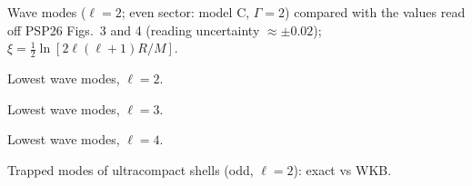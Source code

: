 \documentclass[11pt,a4paper]{article}
\numberwithin{equation}{section}
\begin{document}
\begin{table}[h]\centering\small
\caption{Wave modes ($\ell=2$; even sector: model C, $\Gamma=2$) compared with the values read off PSP26 Figs.~3 and 4 (reading uncertainty $\approx\pm0.02$); $\xi=\tfrac12\ln[2\ell(\ell+1)R/M]$.}\label{tab:psp}

\end{table}

\begin{table}[h]\centering\scriptsize
\caption{Lowest wave modes, $\ell=2$.}\label{tab:qnm2}

\end{table}
\begin{table}[h]\centering\scriptsize
\caption{Lowest wave modes, $\ell=3$.}\label{tab:qnm3}

\end{table}
\begin{table}[h]\centering\scriptsize
\caption{Lowest wave modes, $\ell=4$.}\label{tab:qnm4}

\end{table}
\begin{table}[h]\centering\small
\caption{Trapped modes of ultracompact shells (odd, $\ell=2$): exact vs WKB.}\label{tab:trapped}

\end{table}
\end{document}
